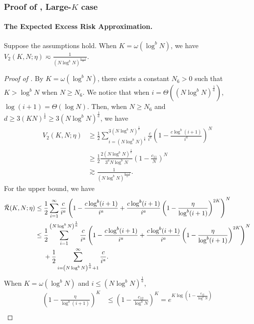 \subsubsection{Proof of , Large-$K$ case}
\paragraph{The Expected Excess Risk Approximation.}
\begin{lemma} \label{lem:one-hot-log-loss-estimate-large-K}
    Suppose the assumptions  hold. When $K = \omega(\log^b N)$, we have $V_2(K,N;\eta) \eqsim \frac{1}{\left(N\log^b N\right)^{\frac{a-1}{a}}}$.
\end{lemma}
\begin{proof}[Proof of ]
By $K =\omega(\log^b N)$, there exists a constant $N_6 > 0$ such that $K > \log^b N$ when $N\geq N_6$.
We notice that when $i = \Theta\left(\left(N\log^b N\right)^{\frac{1}{a}}\right)$, $\log (i+1) = \Theta(\log N)$. Then, when $N\geq N_6$ and $d\geq 3(KN)^{\frac{1}{a}}\geq 3\left(N\log^b N\right)^{\frac{1}{a}}$, we have
\begin{align*}
    V_2(K,N;\eta)&\geq \frac{1}{2}\sum_{i=\left(N\log^b N\right)^{\frac{1}{a}}}^{3\left(N\log^b N\right)^{\frac{1}{a}}}\frac{c}{i^{a}}\left(1-\frac{c\log^b (i+1)}{i^{a}}\right)^N \\
    &\geq \frac{1}{2}\frac{2\left(N\log^b N\right)^{\frac{1}{a}}}{3^aN\log^b N}(1-\frac{c_{11}}{N})^N \\
    &\gtrsim \frac{1}{\left(N\log^b N\right)^{\frac{a-1}{a}}}.
\end{align*}
For the upper bound, we have
\begin{align*}
    \bar{\mathcal{R}}(K,N;\eta)&\leq \frac{1}{2}\sum_{i=1}^{\infty}\frac{c}{i^{a}}\left(1-\frac{c\log^b (i+1)}{i^{a}}+\frac{c\log^b (i+1)}{i^{a}}\left(1-\frac{\eta}{\log^b (i+1)}\right)^{2K}\right)^N \\
    &\leq \frac{1}{2}\sum_{i=1}^{\left(N\log^b N\right)^{\frac{1}{a}}}\frac{c}{i^{a}}\left(1-\frac{c\log^b (i+1)}{i^{a}}+\frac{c\log^b (i+1)}{i^{a}}\left(1-\frac{\eta}{\log^b (i+1)}\right)^{2K}\right)^N\\
    &~~~~+\frac{1}{2}\sum_{i=\left(N\log^b N\right)^{\frac{1}{a}}+1}^{\infty}\frac{c}{i^{a}}. 
\end{align*}
When $K = \omega(\log^b N)$ and $i\leq \left(N\log^b N\right)^{\frac{1}{a}}$, 
\begin{align*}
    \left(1-\frac{\eta}{\log^b (i+1)}\right)^K &\leq \left(1-\frac{c_{12}}{\log^{b} N}\right)^K = e^{K\log \left(1-\frac{c_{12}}{\log^{b} N}\right)} \\

\end{align*}
\end{proof}
